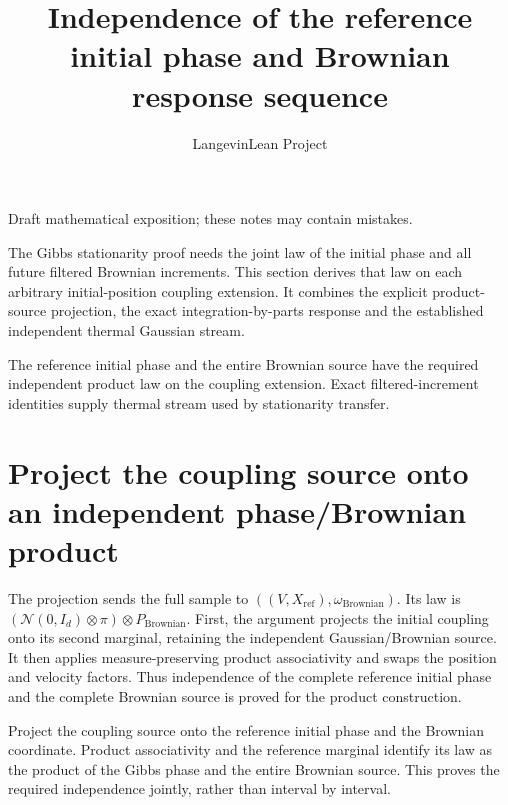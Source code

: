 \documentclass[11pt,a4paper]{article}
\title{\texorpdfstring{Independence of the reference initial phase and Brownian response sequence}{Independence of the reference initial phase and Brownian response sequence}}
\author{LangevinLean Project}
\date{}
\begin{document}
\maketitle
Draft mathematical exposition; these notes may contain mistakes.


The Gibbs stationarity proof needs the joint law of the initial phase and all future filtered Brownian increments. This section derives that law on each arbitrary initial-position coupling extension. It combines the explicit product-source projection, the exact integration-by-parts response and the established independent thermal Gaussian stream.



The reference initial phase and the entire Brownian source have the required independent product law on the coupling extension. Exact filtered-increment identities supply thermal stream used by stationarity transfer.


\section{\texorpdfstring{Project the coupling source onto an independent phase/\allowbreak{}Brownian product}{Project the coupling source onto an independent phase/Brownian product}}


The projection sends the full sample to \(((V,X_\mathrm{ref}),\omega_\mathrm{Brownian})\). Its law is \((\mathcal N(0,I_d)\otimes\pi)\otimes P_\mathrm{Brownian}\). First, the argument projects the initial coupling onto its second marginal, retaining the independent Gaussian/\allowbreak{}Brownian source. It then applies measure-preserving product associativity and swaps the position and velocity factors. Thus independence of the complete reference initial phase and the complete Brownian source is proved for the product construction.



Project the coupling source onto the reference initial phase and the Brownian coordinate. Product associativity and the reference marginal identify its law as the product of the Gibbs phase and the entire Brownian source. This proves the required independence jointly, rather than interval by interval.
\end{document}

